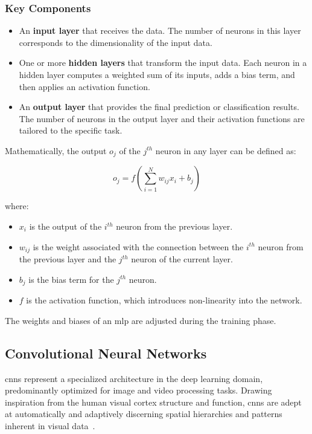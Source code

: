 \subsubsection{Key Components}

\begin{itemize}
	\item An \textbf{input layer} that receives the data. The number of neurons in this layer corresponds to the dimensionality of the input data.
	
	\item One or more \textbf{hidden layers} that transform the input data. Each neuron in a hidden layer computes a weighted sum of its inputs, adds a bias term, and then applies an activation function.
	
	\item An \textbf{output layer} that provides the final prediction or classification results. The number of neurons in the output layer and their activation functions are tailored to the specific task.
\end{itemize}

Mathematically, the output \( o_{j} \) of the \( j^{th} \) neuron in any layer can be defined as:

\[
o_{j} = f\left( \sum_{i=1}^{N} w_{ij} x_{i} + b_{j} \right)
\]

where:
\begin{itemize}
	\item \( x_{i} \) is the output of the \( i^{th} \) neuron from the previous layer.
	\item \( w_{ij} \) is the weight associated with the connection between the \( i^{th} \) neuron from the previous layer and the \( j^{th} \) neuron of the current layer.
	\item \( b_{j} \) is the bias term for the \( j^{th} \) neuron.
	\item \( f \) is the activation function, which introduces non-linearity into the network.
\end{itemize}

The weights and biases of an \gls{mlp} are adjusted during the training phase.


\subsection{Convolutional Neural Networks}

\glspl{cnn} represent a specialized architecture in the deep learning domain, predominantly optimized for image and video processing tasks. Drawing inspiration from the human visual cortex structure and function, \glspl{cnn} are adept at automatically and adaptively discerning spatial hierarchies and patterns inherent in visual data~\cite{lecun1998gradient}.

